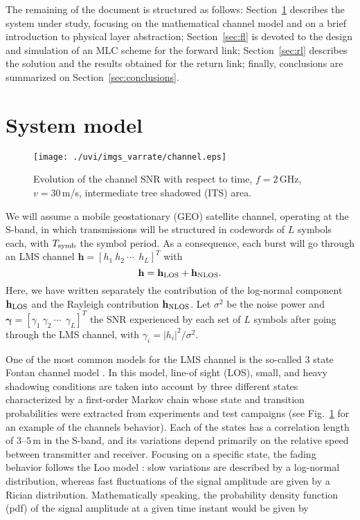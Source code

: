\documentclass[journal,onecolumn,10pt,a4paper]{IEEEtran}
\def\h{{\mathbf h}}
\def\gammab{{\boldsymbol \gamma}}
\begin{document}
The remaining of the document is structured as follows: Section~\ref{sec:sys_model} describes the system under study, focusing on the mathematical channel model and on a brief introduction to physical layer abstraction; Section~\ref{sec:fl} is devoted to the design and simulation of an MLC scheme for the forward link; Section~\ref{sec:rl} describes the solution and the results obtained for the return link; finally, conclusions are summarized on Section~\ref{sec:conclusions}.

\section{System model}\label{sec:sys_model}
\begin{figure}
 \centering
 \texttt{[image: ./uvi/imgs\_varrate/channel.eps]}
\caption{Evolution of the channel SNR with respect to time, $f = 2$\,GHz, $v = 30$\,m/s, intermediate tree shadowed (ITS) area.}
 \label{fig:channel}
\end{figure}

We will assume a mobile geostationary (GEO) satellite channel, operating at the S-band, in which transmissions will be structured in codewords of $L$ symbols each, with $T_{\textnormal{symb}}$ the symbol period. As a consequence, each burst will go through an LMS channel $\h = \left[ h_1 \ h_2 \ \cdots \ \ h_L\right]^T$ with
\begin{equation}
 \h = \h_{\textnormal{LOS}}+\h_{\textnormal{NLOS}}.
\end{equation}
Here, we have written separately the contribution of the log-normal component $\h_{\textnormal{LOS}}$ and the Rayleigh contribution $\h_{\textnormal{NLOS}}$. Let $\sigma^2$ be the noise power and  $\gammab = \left[ \gamma_1 \ \gamma_2 \ \cdots \ \ \gamma_L\right]^T$ the SNR experienced by each set of $L$ symbols after going through the LMS channel, with $\gamma_i = |h_i|^2/\sigma^2$. 

One of the most common models for the LMS channel is the so-called 3 state Fontan channel model \cite{fontan01}. In this model,
line-of sight (LOS), small, and heavy shadowing conditions are taken into account by three different states characterized  by a first-order Markov chain whose state and transition probabilities were extracted from experiments and test
campaigns (see Fig.~\ref{fig:channel} for an example of the channels behavior). Each of the states has a correlation length of $3$--$5$\,m in the S-band, and its variations
depend primarily on the relative speed between transmitter and receiver. Focusing on a specific state, the fading behavior follows the Loo model \cite{loo1985}: slow variations are described by a log-normal distribution, whereas fast fluctuations of the signal amplitude are given by a Rician distribution. Mathematically speaking, the probability density function (pdf) of the signal amplitude at a given time instant would be given by
\end{document}
